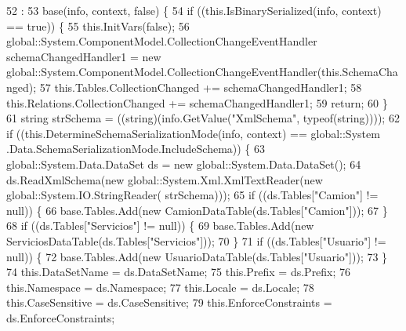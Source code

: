 \begin{DoxyCode}
52                                                                                                            
                                                        : 
53                 base(info, context, \textcolor{keyword}{false}) \{
54             \textcolor{keywordflow}{if} ((this.IsBinarySerialized(info, context) == \textcolor{keyword}{true})) \{
55                 this.InitVars(\textcolor{keyword}{false});
56                 global::System.ComponentModel.CollectionChangeEventHandler schemaChangedHandler1 = \textcolor{keyword}{new} 
      global::System.ComponentModel.CollectionChangeEventHandler(this.SchemaChanged);
57                 this.Tables.CollectionChanged += schemaChangedHandler1;
58                 this.Relations.CollectionChanged += schemaChangedHandler1;
59                 \textcolor{keywordflow}{return};
60             \}
61             \textcolor{keywordtype}{string} strSchema = ((string)(info.GetValue(\textcolor{stringliteral}{"XmlSchema"}, typeof(\textcolor{keywordtype}{string}))));
62             \textcolor{keywordflow}{if} ((this.DetermineSchemaSerializationMode(info, context) == global::System
      .Data.SchemaSerializationMode.IncludeSchema)) \{
63                 global::System.Data.DataSet ds = \textcolor{keyword}{new} global::System.Data.DataSet();
64                 ds.ReadXmlSchema(\textcolor{keyword}{new} global::System.Xml.XmlTextReader(\textcolor{keyword}{new} global::System.IO.StringReader(
      strSchema)));
65                 \textcolor{keywordflow}{if} ((ds.Tables[\textcolor{stringliteral}{"Camion"}] != null)) \{
66                     base.Tables.Add(\textcolor{keyword}{new} CamionDataTable(ds.Tables[\textcolor{stringliteral}{"Camion"}]));
67                 \}
68                 \textcolor{keywordflow}{if} ((ds.Tables[\textcolor{stringliteral}{"Servicios"}] != null)) \{
69                     base.Tables.Add(\textcolor{keyword}{new} ServiciosDataTable(ds.Tables[\textcolor{stringliteral}{"Servicios"}]));
70                 \}
71                 \textcolor{keywordflow}{if} ((ds.Tables[\textcolor{stringliteral}{"Usuario"}] != null)) \{
72                     base.Tables.Add(\textcolor{keyword}{new} UsuarioDataTable(ds.Tables[\textcolor{stringliteral}{"Usuario"}]));
73                 \}
74                 this.DataSetName = ds.DataSetName;
75                 this.Prefix = ds.Prefix;
76                 this.Namespace = ds.Namespace;
77                 this.Locale = ds.Locale;
78                 this.CaseSensitive = ds.CaseSensitive;
79                 this.EnforceConstraints = ds.EnforceConstraints;

\end{DoxyCode}
